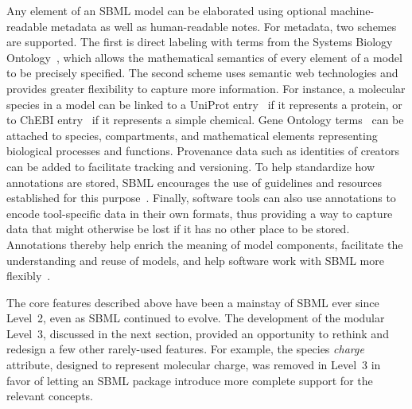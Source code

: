 \documentclass{sbml-paper}
\begin{document}
Any element of an SBML model can be elaborated using optional machine-readable metadata as well as human-readable notes.  For metadata, two schemes are supported.  The first is direct labeling with terms from the Systems Biology Ontology~\citep[SBO;][]{courtot2011controlled}, which allows the mathematical semantics of every element of a model to be precisely specified.  The second scheme uses semantic web technologies and provides greater flexibility to capture more information.  For instance, a molecular species in a model can be linked to a UniProt entry~\citep{uniprot2017} if it represents a protein, or to ChEBI entry~\citep{hastings2013chebi} if it represents a simple chemical.  Gene Ontology terms~\citep[GO;][]{ashburner2000gene} can be attached to species, compartments, and mathematical elements representing biological processes and functions.  Provenance data such as identities of creators can be added to facilitate tracking and versioning.  To help standardize how annotations are stored, SBML encourages the use of guidelines and resources established for this purpose~\citep{le_novere_2005, Laibe2007miriam, Juty2012identifiers}.  Finally, software tools can also use annotations to encode tool-specific data in their own formats, thus providing a way to capture data that might otherwise be lost if it has no other place to be stored.  Annotations thereby help enrich the meaning of model components, facilitate the understanding and reuse of models, and help software work with SBML more flexibly~\citep{krause2011chapter, schulz2011retrieval, Lister2010annotation, Schulz2012propagating, Swainston2009libannotationsbml}.

The core features described above have been a mainstay of SBML ever since Level~2, even as SBML continued to evolve.  The development of the modular Level~3, discussed in the next section, provided an opportunity to rethink and redesign a few other rarely-used features.  For example, the species \emph{charge} attribute, designed to represent molecular charge, was removed in Level~3 in favor of letting an SBML package introduce more complete support for the relevant concepts.
\end{document}

